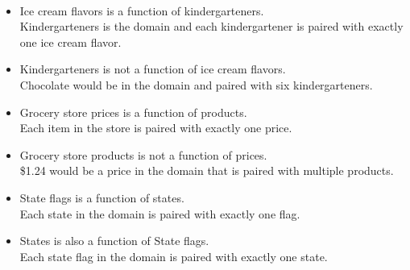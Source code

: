 \documentclass{ximera}
\begin{document}
\begin{example}
\quad \\
\begin{itemize}
\item Ice cream flavors is a function of kindergarteners. \\
Kindergarteners is the domain and each kindergartener is paired with exactly one ice cream flavor. 
\quad \\
\item Kindergarteners is not a function of ice cream flavors. \\
Chocolate would be in the domain and paired with six kindergarteners.
\quad \\
\item Grocery store prices is a function of products.\\
Each item in the store is paired with exactly one price. 
\quad \\
\item Grocery store products is not a function of prices.\\
\$1.24 would be a price in the domain that is paired with multiple products.
\quad \\
\item State flags is a function of states.\\
Each state in the domain is paired with exactly one flag.
\quad \\
\item States is also a function of State flags.\\
Each state flag in the domain is paired with exactly one state.
\end{itemize}

\end{example}
\end{document}
